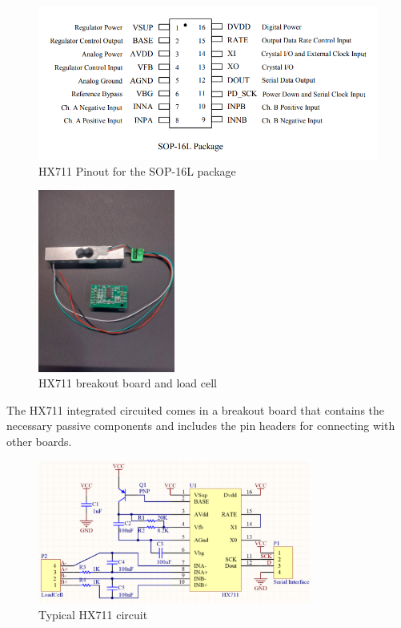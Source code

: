 \documentclass[openright]{normas-utf-tex} %
\begin{document}
\begin{figure}[H]
	\centering
	\includegraphics[width=1\textwidth]{./images/hx711-pinout.png}
	\caption[HX711 Pinout for the SOP-16L package]{HX711 Pinout for the SOP-16L package}
	\label{fig:architecture}
\end{figure}

\begin{figure}[H]
	\centering
	\includegraphics[width=0.4\textwidth]{./images/hx711.jpeg}
	\caption[HX711 breakout board and load cell]{HX711 breakout board and load cell}
	\label{fig:weighttesting}
\end{figure}

The HX711 integrated circuited comes in a breakout board that contains the necessary passive components
and includes the pin headers for connecting with other boards.

\begin{figure}[H]
	\centering
	\includegraphics[width=0.8\textwidth]{./images/hx711circuit.png}
	\caption[Typical HX711 circuit]{Typical HX711 circuit}
\end{figure}
\end{document}
